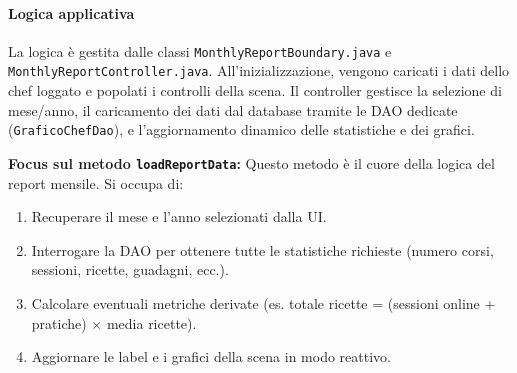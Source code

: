 \paragraph{Logica applicativa}
La logica è gestita dalle classi \texttt{MonthlyReportBoundary.java} e \texttt{MonthlyReportController.java}. All'inizializzazione, vengono caricati i dati dello chef loggato e popolati i controlli della scena. Il controller gestisce la selezione di mese/anno, il caricamento dei dati dal database tramite le DAO dedicate (\texttt{GraficoChefDao}), e l'aggiornamento dinamico delle statistiche e dei grafici.

\textbf{Focus sul metodo \texttt{loadReportData}:}
Questo metodo è il cuore della logica del report mensile. Si occupa di:
\begin{enumerate}
    \item Recuperare il mese e l'anno selezionati dalla UI.
    \item Interrogare la DAO per ottenere tutte le statistiche richieste (numero corsi, sessioni, ricette, guadagni, ecc.).
    \item Calcolare eventuali metriche derivate (es. totale ricette = (sessioni online + pratiche) $\times$ media ricette).
    \item Aggiornare le label e i grafici della scena in modo reattivo.
\end{enumerate}

